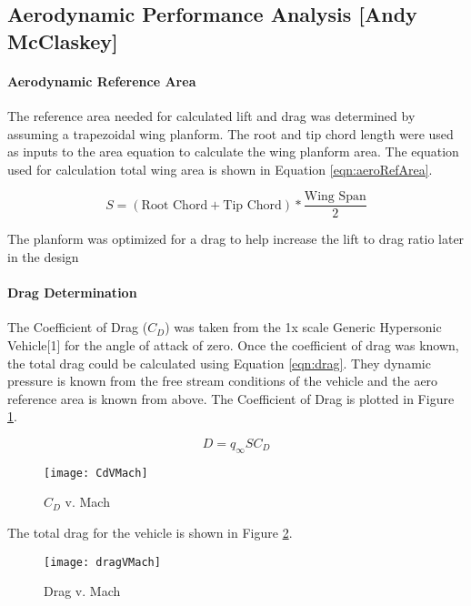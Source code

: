 \subsection{Aerodynamic Performance Analysis [Andy McClaskey]}
\paragraph{Aerodynamic Reference Area}
The reference area needed for calculated lift and drag was determined by assuming a trapezoidal wing planform. The root and tip chord length were used as inputs to the area equation to calculate the wing planform area. The equation used for calculation total wing area is shown in Equation \ref{eqn:aeroRefArea}.

\begin{equation}
\label{eqn:aeroRefArea}
S = (\text{Root Chord} + \text{Tip Chord})*\frac{\text{Wing Span}}{2}
\end{equation}









The planform was optimized for a drag to help increase the lift to drag ratio later in the design

\paragraph{Drag Determination}

The Coefficient of Drag ($C_D$) was taken from the 1x scale Generic Hypersonic Vehicle[1] for the angle of attack of zero. Once the coefficient of drag was known, the total drag could be calculated using Equation \ref{eqn:drag}. They dynamic pressure is known from the free stream conditions of the vehicle and the aero reference area is known from above. The Coefficient of Drag is plotted in Figure \ref{fig:CdVMach}.

\begin{equation}
\label{eqn:drag}
D = q_{\infty}SC_D
\end{equation}

\begin{figure}[H]
\texttt{[image: CdVMach]}
\caption{$C_D$ v. Mach}
\label{fig:CdVMach}
\end{figure}

The total drag for the vehicle is shown in Figure \ref{fig:dragVMach}.

\begin{figure}[H]
\texttt{[image: dragVMach]}
\caption{Drag v. Mach}
\label{fig:dragVMach}
\end{figure}

